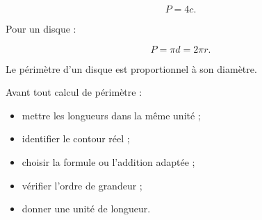 \[
\boxed{P=4c}.
\]

Pour un disque :

\[
\boxed{P=\pi d=2\pi r}.
\]

Le périmètre d’un disque est proportionnel à son diamètre.

Avant tout calcul de périmètre :

\begin{itemize}
\item mettre les longueurs dans la même unité ;
\item identifier le contour réel ;
\item choisir la formule ou l’addition adaptée ;
\item vérifier l’ordre de grandeur ;
\item donner une unité de longueur.
\end{itemize}

